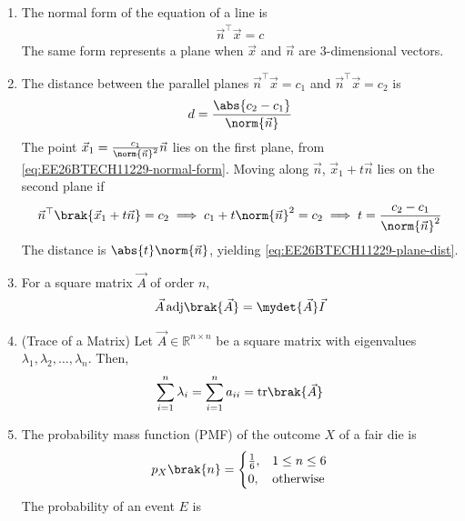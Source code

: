 \begin{enumerate}[label=\thesubsection.\arabic*, ref=\thesubsection.\theenumi]
\item The normal form of the equation of a line is
\begin{align}
	\vec{n}^{\top}\vec{x} = c
	\label{eq:EE26BTECH11229-normal-form}
\end{align}
The same form represents a plane when $\vec{x}$ and $\vec{n}$ are $3$-dimensional vectors.
\item The distance between the parallel planes $\vec{n}^{\top}\vec{x} = c_1$ and $\vec{n}^{\top}\vec{x} = c_2$ is
\begin{align}
	d = \frac{\abs{c_2 - c_1}}{\norm{\vec{n}}}
	\label{eq:EE26BTECH11229-plane-dist}
\end{align}
\solution
The point $\vec{x}_1 = \frac{c_1}{\norm{\vec{n}}^2}\vec{n}$ lies on the first plane, from \eqref{eq:EE26BTECH11229-normal-form}. Moving along $\vec{n}$, $\vec{x}_1 + t\vec{n}$ lies on the second plane if
\begin{align}
	\vec{n}^{\top}\brak{\vec{x}_1 + t\vec{n}} = c_2
	\implies c_1 + t\norm{\vec{n}}^2 = c_2
	\implies t = \frac{c_2 - c_1}{\norm{\vec{n}}^2}
\end{align}
The distance is $\abs{t}\norm{\vec{n}}$, yielding \eqref{eq:EE26BTECH11229-plane-dist}.
\item For a square matrix $\vec{A}$ of order $n$,
\begin{align}
	\vec{A}\,\text{adj}\brak{\vec{A}} = \mydet{\vec{A}}\vec{I}
	\label{eq:EE26BTECH11229-adj}
\end{align}
\item (Trace of a Matrix) Let $\vec{A} \in \mathbb{R}^{n \times n}$ be a square matrix with eigenvalues $\lambda_1, \lambda_2, \ldots, \lambda_n$. Then,
\begin{align}
	\sum_{i=1}^{n}\lambda_i = \sum_{i=1}^{n}a_{ii} = \text{tr}\brak{\vec{A}}
	\label{eq:EE26BTECH11229-trace}
\end{align}
\item The probability mass function (PMF) of the outcome $X$ of a fair die is
\begin{align}
	p_X\brak{n} = \begin{cases}
		\frac{1}{6}, & 1 \le n \le 6
		\\
		0, & \text{otherwise}
	\end{cases}
	\label{eq:EE26BTECH11229-die-pmf}
\end{align}
The probability of an event $E$ is
\begin{align}

\end{align}
\end{enumerate}
